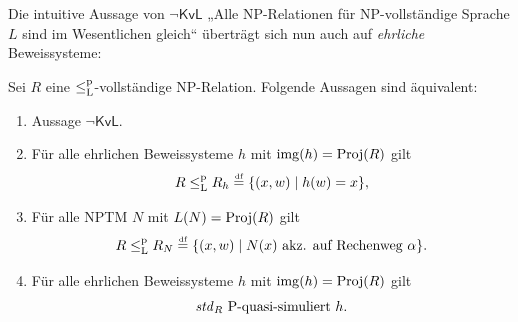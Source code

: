 Die intuitive Aussage von $\neg\mathsf{KvL}$ „Alle NP-Relationen für NP-vollständige Sprache $L$ sind im Wesentlichen gleich“ überträgt sich nun auch auf \emph{ehrliche} Beweissysteme:
\begin{theorem}\label{thm:kvl-ps}
    Sei $R$ eine $\leqlp$-vollständige NP-Relation.
    Folgende Aussagen sind äquivalent:
    \begin{enumerate}
        \item Aussage $\neg\mathsf{KvL}$.
        \item Für alle ehrlichen Beweissysteme $h$ mit $\img(h)=\Proj(R)$ gilt
\[ R \leqlp R_{h}\defeq  \{ (x, w) \mid  \text{$h(w)=x$}\}, \]
        \item Für alle NPTM $N$ mit $L(N)=\Proj(R)$ gilt
            \[ R \leqlp R_N \defeq  \{ (x, w) \mid  \text{$N(x)$ akz. auf Rechenweg $\alpha$}\}. \]
        \item Für alle ehrlichen Beweissysteme $h$ mit $\img(h)=\Proj(R)$ gilt
    \[  \text{$\mathit{std}_R$ $\P$-quasi-simuliert $h$}. \]
    \end{enumerate}
\end{theorem}
